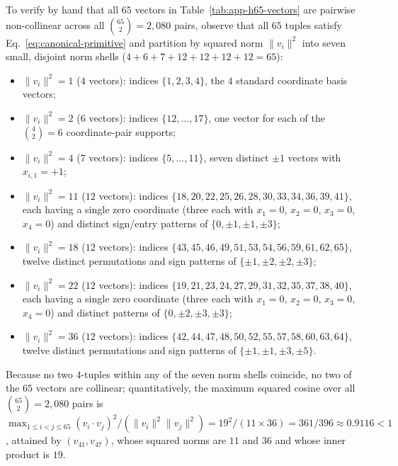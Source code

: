 \documentclass[
  aps,
  pra,
  reprint,
  superscriptaddress,
  amsmath,
  amssymb,
  nofootinbib,
  floatfix
]{revtex4-2}
\theoremstyle{definition}
\theoremstyle{remark}
\begin{document}
To verify by hand that all $65$ vectors in Table~\ref{tab:app-h65-vectors} are pairwise non-collinear across all $\binom{65}{2}=2{,}080$ pairs, observe that all $65$ tuples satisfy Eq.~\eqref{eq:canonical-primitive} and partition by squared norm $\|v_i\|^2$ into seven small, disjoint norm shells ($4+6+7+12+12+12+12=65$):
\begin{itemize}
\item $\|v_i\|^2=1$ ($4$ vectors): indices $\{1,2,3,4\}$, the $4$ standard coordinate basis vectors;
\item $\|v_i\|^2=2$ ($6$ vectors): indices $\{12,\ldots,17\}$, one vector for each of the $\binom{4}{2}=6$ coordinate-pair supports;
\item $\|v_i\|^2=4$ ($7$ vectors): indices $\{5,\ldots,11\}$, seven distinct $\pm1$ vectors with $x_{i,1}=+1$;
\item $\|v_i\|^2=11$ ($12$ vectors): indices $\{18,20,22,25,26,28,30,33,34,36,39,41\}$, each having a single zero coordinate (three each with $x_1=0$, $x_2=0$, $x_3=0$, $x_4=0$) and distinct sign/entry patterns of $\{0,\pm1,\pm1,\pm3\}$;
\item $\|v_i\|^2=18$ ($12$ vectors): indices $\{43,45,46,49,51,53,54,56,59,61,62,65\}$, twelve distinct permutations and sign patterns of $\{\pm1,\pm2,\pm2,\pm3\}$;
\item $\|v_i\|^2=22$ ($12$ vectors): indices $\{19,21,23,24,27,29,31,32,35,37,38,40\}$, each having a single zero coordinate (three each with $x_1=0$, $x_2=0$, $x_3=0$, $x_4=0$) and distinct patterns of $\{0,\pm2,\pm3,\pm3\}$;
\item $\|v_i\|^2=36$ ($12$ vectors): indices $\{42,44,47,48,50,52,55,57,58,60,63,64\}$, twelve distinct permutations and sign patterns of $\{\pm1,\pm1,\pm3,\pm5\}$.
\end{itemize}
Because no two $4$-tuples within any of the seven norm shells coincide, no two of the $65$ vectors are collinear; quantitatively, the maximum squared cosine over all $\binom{65}{2}=2{,}080$ pairs is $\max_{1\le i<j\le 65}(v_i\cdot v_j)^2/(\|v_i\|^2\|v_j\|^2)=19^2/(11\times 36)=361/396\approx 0.9116<1$, attained by $(v_{41},v_{47})$, whose squared norms are $11$ and $36$ and whose inner product is $19$.
\end{document}
